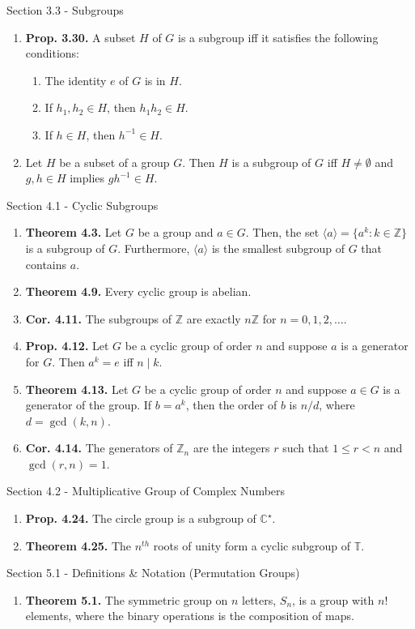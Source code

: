 \documentclass[12pt]{article}
\theoremstyle{definition}
\theoremstyle{named}
\begin{document}
\begin{section}{Section 3.3 - Subgroups}
    \begin{enumerate}
        \item \textbf{Prop. 3.30. } A subset $H$ of $G$ is a subgroup iff it satisfies the following conditions: 
        \begin{enumerate}
            \item The identity $e$ of $G$ is in $H$. 
            \item If $h_1,h_2 \in H$, then $h_1h_2 \in H$. 
            \item If $h \in H$, then $h^{-1} \in H$. 
        \end{enumerate}
        \item Let $H$ be a subset of a group $G$. Then $H$ is a subgroup of $G$ iff $H \neq \emptyset$ and $g,h \in H$ implies $gh^{-1} \in H$. 
    \end{enumerate}
\end{section}

\begin{section}{Section 4.1 - Cyclic Subgroups}
    \begin{enumerate}
        \item \textbf{Theorem 4.3. } Let $G$ be a group and $a \in G$. Then, the set $\langle a \rangle = \{a^k: k \in \mathbb{Z}\}$ is a subgroup of $G$. Furthermore, $\langle a \rangle$ is the smallest subgroup of $G$ that contains $a$. 
        \item \textbf{Theorem 4.9. } Every cyclic group is abelian. 
        \item \textbf{Cor. 4.11. } The subgroups of $\mathbb{Z}$ are exactly $n\mathbb{Z}$ for $n=0,1,2,\dots$. 
        \item \textbf{Prop. 4.12. } Let $G$ be a cyclic group of order $n$ and suppose $a$ is a generator for $G$. Then $a^k=e$ iff $n \mid k$. 
        \item \textbf{Theorem 4.13. } Let $G$ be a cyclic group of order $n$ and suppose $a \in G$ is a generator of the group. If $b = a^k$, then the order of $b$ is $n/d$, where $d = \gcd(k,n)$. 
        \item \textbf{Cor. 4.14. } The generators of $\mathbb{Z}_n$ are the integers $r$ such that $1 \leq r < n$ and $\gcd(r,n)=1$. 
    \end{enumerate}
\end{section}

\begin{section}{Section 4.2 - Multiplicative Group of Complex Numbers}
    \begin{enumerate}
        \item \textbf{Prop. 4.24. } The circle group is a subgroup of $\mathbb{C}^\star$. 
        \item \textbf{Theorem 4.25. } The $n^{th}$ roots of unity form a cyclic subgroup of $\mathbb{T}$. 
    \end{enumerate}
\end{section}

\begin{section}{Section 5.1 - Definitions \& Notation (Permutation Groups)}
    \begin{enumerate}
        \item \textbf{Theorem 5.1. } The symmetric group on $n$ letters, $S_n$, is a group with $n!$ elements, where the binary operations is the composition of maps. 
    \end{enumerate}
\end{section}
\end{document}
